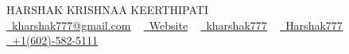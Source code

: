 \documentclass[letterpaper,11pt]{article}
\begin{document}


\begin{center}
  {\Huge \scshape HARSHAK KRISHNAA KEERTHIPATI} \\ \vspace{3pt}
  \href{mailto:kharshak777@gmail.com}{\raisebox{-0.2\height}\faEnvelope\  \underline{kharshak777@gmail.com}} ~ 
  \href{https://harshak.vercel.app}{\raisebox{-0.2\height}\faUser\ \underline{Website}} ~
  \href{https://linkedin.com/in/kharshak777/}{\raisebox{-0.2\height}\faLinkedin\ \underline{kharshak777}}  ~
  \href{https://github.com/Harshak777}{\raisebox{-0.2\height}\faGithub\ \underline{Harshak777}} ~
  \href{tel:+1(602)-582-5111}{\raisebox{-0.3\height}\faPhone\ \underline{+1(602)-582-5111}} ~
  \vspace{-8pt}
\end{center}
\end{document}
